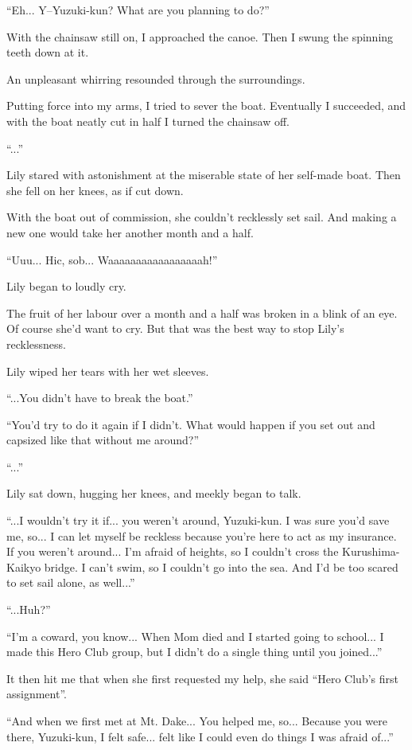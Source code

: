 ``Eh... Y--Yuzuki-kun? What are you planning to do?''

With the chainsaw still on, I approached the canoe. Then I swung the spinning teeth down at it.

An unpleasant whirring resounded through the surroundings.

Putting force into my arms, I tried to sever the boat. Eventually I succeeded, and with the boat neatly cut in half I turned the chainsaw off.

``...''

Lily stared with astonishment at the miserable state of her self-made boat. Then she fell on her knees, as if cut down.

With the boat out of commission, she couldn't recklessly set sail. And making a new one would take her another month and a half.

``Uuu... Hic, sob... Waaaaaaaaaaaaaaaaah!''

Lily began to loudly cry.

The fruit of her labour over a month and a half was broken in a blink of an eye. Of course she'd want to cry. But that was the best way to stop Lily's recklessness.

Lily wiped her tears with her wet sleeves.

``...You didn't have to break the boat.''

``You'd try to do it again if I didn't. What would happen if you set out and capsized like that without me around?''

``...''

Lily sat down, hugging her knees, and meekly began to talk.

``...I wouldn't try it if... you weren't around, Yuzuki-kun. I was sure you'd save me, so... I can let myself be reckless because you're here to act as my insurance. If you weren't around... I'm afraid of heights, so I couldn't cross the Kurushima-Kaikyo bridge. I can't swim, so I couldn't go into the sea. And I'd be too scared to set sail alone, as well...''

``...Huh?''

``I'm a coward, you know... When Mom died and I started going to school... I made this Hero Club group, but I didn't do a single thing until you joined...''

It then hit me that when she first requested my help, she said ``Hero Club's first assignment''.

``And when we first met at Mt. Dake... You helped me, so... Because you were there, Yuzuki-kun, I felt safe... felt like I could even do things I was afraid of...''

